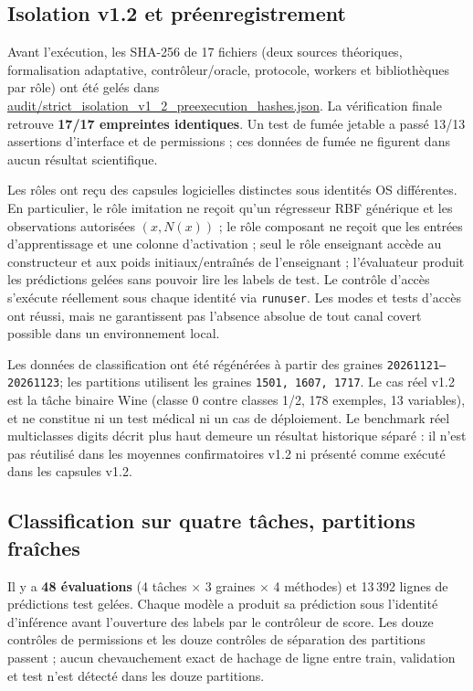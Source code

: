 \documentclass[11pt,a4paper]{article}
\begin{document}
\subsection{Isolation v1.2 et préenregistrement}
Avant l'exécution, les SHA-256 de 17 fichiers (deux sources théoriques, formalisation adaptative, contrôleur/oracle, protocole, workers et bibliothèques par rôle) ont été gelés dans \url{audit/strict_isolation_v1_2_preexecution_hashes.json}. La vérification finale retrouve \textbf{17/17 empreintes identiques}. Un test de fumée jetable a passé 13/13 assertions d'interface et de permissions ; ces données de fumée ne figurent dans aucun résultat scientifique.

Les rôles ont reçu des capsules logicielles distinctes sous identités OS différentes. En particulier, le rôle imitation ne reçoit qu'un régresseur RBF générique et les observations autorisées $(x,N(x))$ ; le rôle composant ne reçoit que les entrées d'apprentissage et une colonne d'activation ; seul le rôle enseignant accède au constructeur et aux poids initiaux/entraînés de l'enseignant ; l'évaluateur produit les prédictions gelées sans pouvoir lire les labels de test. Le contrôle d'accès s'exécute réellement sous chaque identité via \texttt{runuser}. Les modes et tests d'accès ont réussi, mais ne garantissent pas l'absence absolue de tout canal covert possible dans un environnement local.

Les données de classification ont été régénérées à partir des graines \texttt{20261121--20261123}; les partitions utilisent les graines \texttt{1501, 1607, 1717}. Le cas réel v1.2 est la tâche binaire Wine (classe 0 contre classes 1/2, 178 exemples, 13 variables), et ne constitue ni un test médical ni un cas de déploiement. Le benchmark réel multiclasses digits décrit plus haut demeure un résultat historique séparé : il n'est pas réutilisé dans les moyennes confirmatoires v1.2 ni présenté comme exécuté dans les capsules v1.2.

\subsection{Classification sur quatre tâches, partitions fraîches}
Il y a \textbf{48 évaluations} (4 tâches $\times$ 3 graines $\times$ 4 méthodes) et 13\,392 lignes de prédictions test gelées. Chaque modèle a produit sa prédiction sous l'identité d'inférence avant l'ouverture des labels par le contrôleur de score. Les douze contrôles de permissions et les douze contrôles de séparation des partitions passent ; aucun chevauchement exact de hachage de ligne entre train, validation et test n'est détecté dans les douze partitions.
\end{document}
